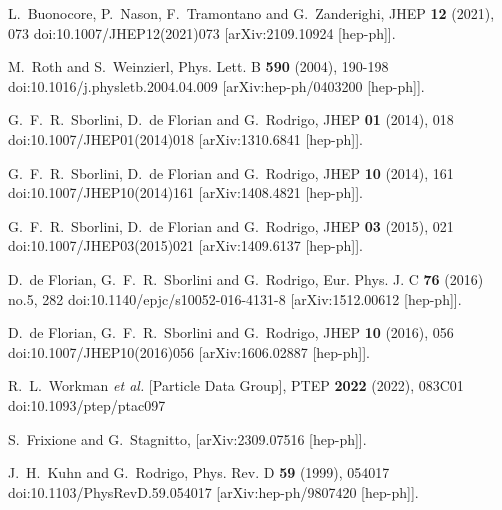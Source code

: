 \documentclass[12pt]{article}
\begin{document}
\begin{thebibliography}{99}
L.~Buonocore, P.~Nason, F.~Tramontano and G.~Zanderighi,
JHEP \textbf{12} (2021), 073
doi:10.1007/JHEP12(2021)073
[arXiv:2109.10924 [hep-ph]].


M.~Roth and S.~Weinzierl,
Phys. Lett. B \textbf{590} (2004), 190-198
doi:10.1016/j.physletb.2004.04.009
[arXiv:hep-ph/0403200 [hep-ph]].


G.~F.~R.~Sborlini, D.~de Florian and G.~Rodrigo,
JHEP \textbf{01} (2014), 018
doi:10.1007/JHEP01(2014)018
[arXiv:1310.6841 [hep-ph]].

G.~F.~R.~Sborlini, D.~de Florian and G.~Rodrigo,
JHEP \textbf{10} (2014), 161
doi:10.1007/JHEP10(2014)161
[arXiv:1408.4821 [hep-ph]].

G.~F.~R.~Sborlini, D.~de Florian and G.~Rodrigo,
JHEP \textbf{03} (2015), 021
doi:10.1007/JHEP03(2015)021
[arXiv:1409.6137 [hep-ph]].

D.~de Florian, G.~F.~R.~Sborlini and G.~Rodrigo,
Eur. Phys. J. C \textbf{76} (2016) no.5, 282
doi:10.1140/epjc/s10052-016-4131-8
[arXiv:1512.00612 [hep-ph]].

D.~de Florian, G.~F.~R.~Sborlini and G.~Rodrigo,
JHEP \textbf{10} (2016), 056
doi:10.1007/JHEP10(2016)056
[arXiv:1606.02887 [hep-ph]].

R.~L.~Workman \textit{et al.} [Particle Data Group],
PTEP \textbf{2022} (2022), 083C01
doi:10.1093/ptep/ptac097

S.~Frixione and G.~Stagnitto,
[arXiv:2309.07516 [hep-ph]].

J.~H.~Kuhn and G.~Rodrigo,
Phys. Rev. D \textbf{59} (1999), 054017
doi:10.1103/PhysRevD.59.054017
[arXiv:hep-ph/9807420 [hep-ph]].


\end{thebibliography}




\end{document}
